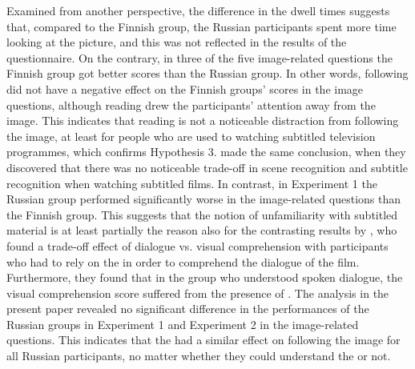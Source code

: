 \documentclass[output=paper]{langsci/langscibook}
\begin{document}
Examined from another perspective, the difference in the dwell times suggests that, compared to the Finnish group, the Russian participants spent more time looking at the picture, and this was not reflected in the results of the questionnaire. On the contrary, in three of the five image-related questions the Finnish group got better scores than the Russian group. In other words, following  did not have a negative effect on the Finnish groups' scores in the image questions, although reading  drew the participants' attention away from the image. This indicates that reading  is not a noticeable distraction from following the image, at least for people who are used to watching subtitled television programmes, which confirms Hypothesis 3. \citet{Perego2010} made the same conclusion, when they discovered that there was no noticeable trade-off in scene recognition and subtitle recognition when watching subtitled films. In contrast, in Experiment 1 the Russian group performed significantly worse in the image-related questions than the Finnish group. This suggests that the notion of unfamiliarity with subtitled material is at least partially the reason also for the contrasting results by \citet{lavaur2011}, who found a trade-off effect of dialogue vs. visual comprehension with participants who had to rely on the  in order to comprehend the dialogue of the film. Furthermore, they found that in the group who understood spoken dialogue, the visual comprehension score suffered from the presence of . The analysis in the present paper revealed no significant difference in the performances of the Russian groups in Experiment 1 and Experiment 2 in the image-related questions. This indicates that the  had a similar effect on following the image for all Russian participants, no matter whether they could understand the  or not.
\end{document}
